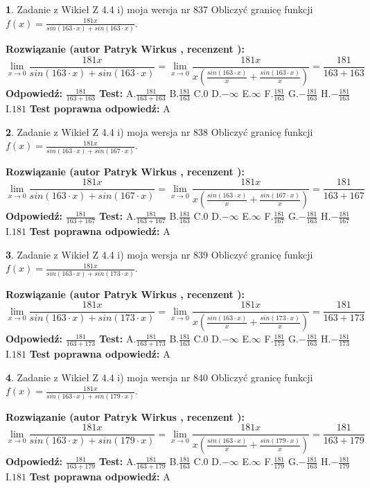 \documentclass[12pt, a4paper]{article}
\theoremstyle{definition} %
\newtheorem{zad}{}
\newcommand{\zadStart}[1]{\begin{zad}#1\newline}
\newcommand{\zadStop}{\end{zad}}
\newcommand{\rozwStart}[2]{\noindent \textbf{Rozwiązanie (autor #1 , recenzent #2): }\newline}
\newcommand{\rozwStop}{\newline}
\newcommand{\odpStart}{\noindent \textbf{Odpowiedź:}\newline}
\newcommand{\odpStop}{\newline}
\newcommand{\testStart}{\noindent \textbf{Test:}\newline}
\newcommand{\testStop}{\newline}
\newcommand{\kluczStart}{\noindent \textbf{Test poprawna odpowiedź:}\newline}
\newcommand{\kluczStop}{\newline}
\begin{document}
\zadStart{Zadanie z Wikieł Z 4.4 i) moja wersja nr 837}
Obliczyć granicę funkcji $f(x)=\frac{181x}{sin(163\cdot x) +sin(163\cdot x)}$.
\zadStop
\rozwStart{Patryk Wirkus}{}
$$\lim\limits_{x\to 0}\frac{181x}{sin(163\cdot x) +sin(163\cdot x)}=\lim\limits_{x\to 0}\frac{181x}{x(\frac{sin(163\cdot x)}{x}+\frac{sin(163\cdot x)}{x})}=\frac{181}{163+163}$$
\rozwStop
\odpStart
$\frac{181}{163+163}$
\odpStop
\testStart
A.$\frac{181}{163+163}$
B.$\frac{181}{163}$
C.$0$
D.$-\infty$
E.$\infty$
F.$\frac{181}{163}$
G.$-\frac{181}{163}$
H.$-\frac{181}{163}$
I.$181$
\testStop
\kluczStart
A
\kluczStop



\zadStart{Zadanie z Wikieł Z 4.4 i) moja wersja nr 838}
Obliczyć granicę funkcji $f(x)=\frac{181x}{sin(163\cdot x) +sin(167\cdot x)}$.
\zadStop
\rozwStart{Patryk Wirkus}{}
$$\lim\limits_{x\to 0}\frac{181x}{sin(163\cdot x) +sin(167\cdot x)}=\lim\limits_{x\to 0}\frac{181x}{x(\frac{sin(163\cdot x)}{x}+\frac{sin(167\cdot x)}{x})}=\frac{181}{163+167}$$
\rozwStop
\odpStart
$\frac{181}{163+167}$
\odpStop
\testStart
A.$\frac{181}{163+167}$
B.$\frac{181}{163}$
C.$0$
D.$-\infty$
E.$\infty$
F.$\frac{181}{167}$
G.$-\frac{181}{163}$
H.$-\frac{181}{167}$
I.$181$
\testStop
\kluczStart
A
\kluczStop



\zadStart{Zadanie z Wikieł Z 4.4 i) moja wersja nr 839}
Obliczyć granicę funkcji $f(x)=\frac{181x}{sin(163\cdot x) +sin(173\cdot x)}$.
\zadStop
\rozwStart{Patryk Wirkus}{}
$$\lim\limits_{x\to 0}\frac{181x}{sin(163\cdot x) +sin(173\cdot x)}=\lim\limits_{x\to 0}\frac{181x}{x(\frac{sin(163\cdot x)}{x}+\frac{sin(173\cdot x)}{x})}=\frac{181}{163+173}$$
\rozwStop
\odpStart
$\frac{181}{163+173}$
\odpStop
\testStart
A.$\frac{181}{163+173}$
B.$\frac{181}{163}$
C.$0$
D.$-\infty$
E.$\infty$
F.$\frac{181}{173}$
G.$-\frac{181}{163}$
H.$-\frac{181}{173}$
I.$181$
\testStop
\kluczStart
A
\kluczStop



\zadStart{Zadanie z Wikieł Z 4.4 i) moja wersja nr 840}
Obliczyć granicę funkcji $f(x)=\frac{181x}{sin(163\cdot x) +sin(179\cdot x)}$.
\zadStop
\rozwStart{Patryk Wirkus}{}
$$\lim\limits_{x\to 0}\frac{181x}{sin(163\cdot x) +sin(179\cdot x)}=\lim\limits_{x\to 0}\frac{181x}{x(\frac{sin(163\cdot x)}{x}+\frac{sin(179\cdot x)}{x})}=\frac{181}{163+179}$$
\rozwStop
\odpStart
$\frac{181}{163+179}$
\odpStop
\testStart
A.$\frac{181}{163+179}$
B.$\frac{181}{163}$
C.$0$
D.$-\infty$
E.$\infty$
F.$\frac{181}{179}$
G.$-\frac{181}{163}$
H.$-\frac{181}{179}$
I.$181$
\testStop
\kluczStart
A
\kluczStop
\end{document}
